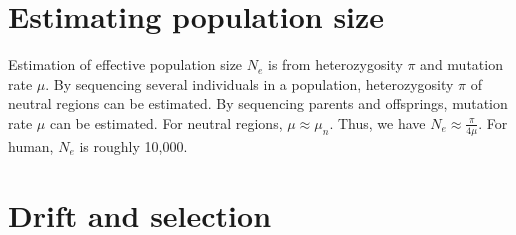 \documentclass[11pt]{article}
\begin{document}
\begin{sloppypar}
\section{Estimating population size}
Estimation of effective population size $N_e$ is from heterozygosity $\pi$ and mutation rate $\mu$. 
By sequencing several individuals in a population, heterozygosity $\pi$ of neutral regions can be estimated. 
By sequencing parents and offsprings, mutation rate $\mu$ can be estimated. 
For neutral regions, $\mu \approx \mu_n$. 
Thus, we have $N_e \approx \frac{\pi}{4\mu}$. 
For human, $N_e$ is roughly 10,000. 

\section{Drift and selection}



\end{sloppypar}
\end{document}
